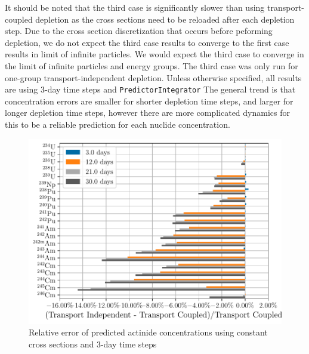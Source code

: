     It should be noted that the third case is significantly slower than using
    transport-coupled depletion as the cross sections need to be reloaded after
    each depletion step. Due to the cross section discretization that occurs
    before peforming depletion, we do not expect the third case results to
    converge to the first case results in limit of infinite particles. We would
    expect the third case to converge in the limit of infinite particles and
    energy groups. The third case was only run for one-group
    transport-independent depletion. Unless otherwise
    specified, all results are using 3-day time steps and
    \verb.PredictorIntegrator. The general trend is that concentration errors
    are smaller for shorter depletion time steps, and larger for longer
    depletion time steps, however there are more complicated dynamics for this
    to be a reliable prediction for each nuclide concentration.


    \begin{figure}[h!tpb]
        \centering
        \includegraphics[width=\linewidth]{figs/actinides_constant_xs_predictor_fission_q_days.pdf}
        \caption[]{Relative error of predicted actinide concentrations using
        constant cross sections and 3-day time steps}
        \label{fig:actinides-error-constant-xs-days}
    \end{figure}

